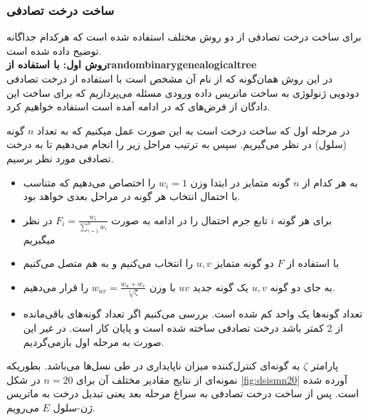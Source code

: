 \subsubsection{ساخت درخت تصادفی}
برای ساخت درخت تصادفی از دو روش مختلف استفاده شده است که هرکدام جداگانه توضیح داده شده است.
\vspace{20pt}
\\
\textbf{روش اول: با استفاده از\gls{randombinarygenealogicaltree}}
\\
در این روش همان‌گونه که از نام آن مشخص است با استفاده از درخت تصادفی دودویی ژنولوژی به ساخت ماتریس داده ورودی مسئله می‌پردازیم که برای ساخت این دادگان از فرض‌های که در ادامه آمده است استفاده خواهیم کرد. 

در مرحله اول که ساخت درخت است به این صورت عمل میکنیم که به تعداد $n$ گونه (سلول) در نظر می‌گیریم. سپس به ترتیب مراحل زیر را انجام می‌دهیم تا به درخت تصادفی مورد نظر برسیم.
\begin{itemize}
	\item به هر کدام از $n$ گونه متمایز در ابتدا وزن $w_i=1$ را اختصاص می‌دهیم که متناسب با احتمال انتخاب هر گونه در مراحل بعدی خواهد بود.
	\item برای هر گونه ‌$i$ تابع جرم احتمال را در ادامه به صورت $F_i=\frac{w_i}{\sum_{i=1}^{n}w_i}$ در نظر میگیریم
	\item با استفاده از $F$ دو گونه متمایز $u, v$ را انتخاب می‌کنیم و به هم متصل می‌کنیم
	\item به جای دو گونه $u, v$ یک گونه جدید $uv$ با وزن $w_{uv}=\frac{w_u+w_v}{\sqrt[4]{\zeta}}$ را قرار می‌دهیم.
	\item تعداد گونه‌ها یک واحد کم شده است. بررسی می‌کنیم اگر تعداد گونه‌های باقی‌مانده از $2$ کمتر باشد درخت تصادفی ساخته شده است و پایان کار است. در غیر این صورت به مرحله اول بازمی‌گردیم.
\end{itemize}
پارامتر $\zeta$ به گونه‌ای کنترل‌کننده میزان ناپایداری در طی نسل‌ها می‌باشد. بطوریکه نمونه‌ای از نتایج مقادیر مختلف آن برای $n=20$ در شکل \ref{fig:dsismn20} آورده شده است. پس از ساخت درخت تصادفی به سراغ مرحله بعد یعنی تبدیل درخت به ماتریس ژن-سلول $E$ می‌رویم.
